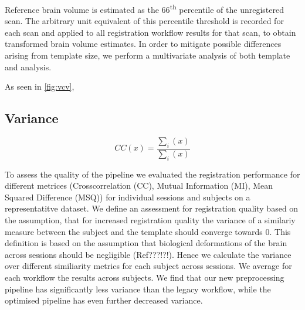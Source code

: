 Reference brain volume is estimated as the 66\textsuperscript{th} percentile of the unregistered scan.
The arbitrary unit equivalent of this percentile threshold is recorded for each scan and applied to all registration workflow results for that scan, to obtain transformed brain volume estimates.
In order to mitigate possible differences arising from template size, we perform a multivariate analysis of both template and analysis.


\begin{sansmath}
\end{sansmath}

As seen in \cref{fig:vcv},

\subsection{Variance}

\[ CC(x) = \frac{\sum_i{(x)}}{\sum_i{(x)}} \]


To assess the quality of the pipeline we evaluated the registration performance for different metrices (Crosscorrelation (CC), Mutual Information (MI), Mean Squared Difference (MSQ)) for individual sessions and subjects on a representatitve dataset.  We define an assessment for registration quality based on the assumption, that for increased registration quality the variance of a similariy measure between the subject and the template should converge towards 0. This definition is based on the assumption that biological deformations of the brain across sessions should be negligible (Ref???!?!). Hence we calculate the variance over different similiarity metrics for each subject across sessions. We average for each workflow the results across subjects. We find that our new preprocessing pipeline has significantly less variance than the legacy workflow, while the optimised pipeline has even further decreased variance.
